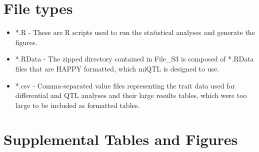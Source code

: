 \documentclass[9pt,twocolumn,twoside]{gsajnl}
\begin{document}
\section{File types}

\begin{itemize}
	\item *.R - These are R scripts used to run the statistical analyses and generate the figures.
	\item *.RData - The zipped directory contained in File\_S3 is composed of *.RData files that are HAPPY formatted, which miQTL is designed to use.
	\item *.csv - Comma-separated value files representing the trait data used for differential and QTL analyses and their large results tables, which were too large to be included as formatted tables.
\end{itemize}

\thispagestyle{empty}
\clearpage

\section{Supplemental Tables and Figures}
\setcounter{table}{0}
\setcounter{figure}{0}
\renewcommand{\thetable}{S\arabic{table}}
\renewcommand{\thefigure}{S\arabic{figure}}
\setcounter{page}{1}
\end{document}
